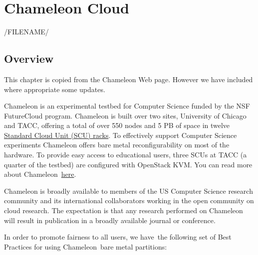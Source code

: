 
\chapter{Chameleon Cloud}
\label{C:chameleon}
/FILENAME/

\section{Overview}

\FILENAME

This chapter is copied from the Chameleon Web page. However we have
included where appropriate some updates. 

Chameleon is an experimental testbed for Computer Science funded by the
NSF FutureCloud program. Chameleon is built over two sites, University
of Chicago and TACC, offering a total of over 550 nodes and 5 PB of
space in twelve
\href{https://www.chameleoncloud.org/about/hardware-description/}{Standard
Cloud Unit (SCU) racks}. To effectively support Computer Science
experiments Chameleon offers bare metal reconfigurability on most of the
hardware. To provide easy access to educational users, three SCUs at
TACC (a quarter of the testbed) are configured with OpenStack KVM. You
can read more about
Chameleon~\href{https://www.chameleoncloud.org/about/chameleon/}{here}.

Chameleon is broadly available to members of the US Computer Science
research community and its international collaborators working in the
open community on cloud research. The expectation is that any research
performed on Chameleon will result in publication in a broadly
available journal or conference.

In order to promote fairness to all users, we have~the following set of
Best Practices for using Chameleon~bare metal partitions:

